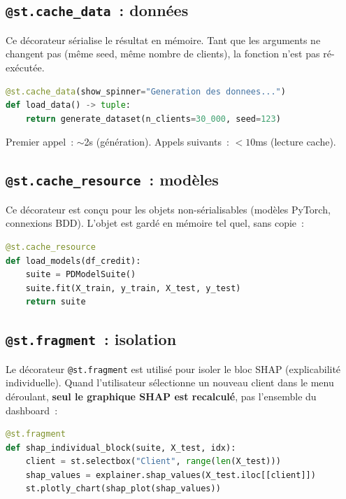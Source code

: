 \documentclass[12pt,a4paper]{article}
\begin{document}
\subsection{\texttt{@st.cache\_data}~: donn\'ees}

Ce d\'ecorateur s\'erialise le r\'esultat en m\'emoire. Tant que les arguments ne changent pas (m\^eme seed, m\^eme nombre de clients), la fonction n'est pas r\'e-ex\'ecut\'ee.

\begin{formulebox}
\begin{lstlisting}[language=Python]
@st.cache_data(show_spinner="Generation des donnees...")
def load_data() -> tuple:
    return generate_dataset(n_clients=30_000, seed=123)
\end{lstlisting}
Premier appel~: $\sim$2s (g\'en\'eration). Appels suivants~: $< 10$ms (lecture cache).
\end{formulebox}

\subsection{\texttt{@st.cache\_resource}~: mod\`eles}

Ce d\'ecorateur est con\c{c}u pour les objets non-s\'erialisables (mod\`eles PyTorch, connexions BDD). L'objet est gard\'e en m\'emoire tel quel, sans copie~:

\begin{lstlisting}[language=Python]
@st.cache_resource
def load_models(df_credit):
    suite = PDModelSuite()
    suite.fit(X_train, y_train, X_test, y_test)
    return suite
\end{lstlisting}

\subsection{\texttt{@st.fragment}~: isolation}

Le d\'ecorateur \texttt{@st.fragment} est utilis\'e pour isoler le bloc SHAP (explicabilit\'e individuelle). Quand l'utilisateur s\'electionne un nouveau client dans le menu d\'eroulant, \textbf{seul le graphique SHAP est recalcul\'e}, pas l'ensemble du dashboard~:

\begin{lstlisting}[language=Python]
@st.fragment
def shap_individual_block(suite, X_test, idx):
    client = st.selectbox("Client", range(len(X_test)))
    shap_values = explainer.shap_values(X_test.iloc[[client]])
    st.plotly_chart(shap_plot(shap_values))
\end{lstlisting}
\end{document}
